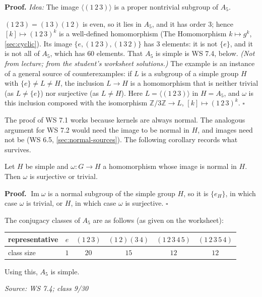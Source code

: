 \documentclass[11pt]{report}
\renewenvironment{proof}[1][Proof]{\noindent\textbf{#1.} }{\hfill$\square$\par\vspace{5pt}}
\newcommand{\srcline}[1]{\par\hfill{\footnotesize\textit{Source: #1}}}
\begin{document}
\begin{proof}
\textit{Idea:} The image $\langle (1\,2\,3) \rangle$ is a proper nontrivial subgroup of $A_5$.\par
$(1\,2\,3) = (1\,3)(1\,2)$ is even, so it lies in $A_5$, and it has order $3$; hence $[k] \mapsto (1\,2\,3)^k$ is a well-defined homomorphism (The Homomorphism $k \mapsto g^k$, \ref{sec:cyclic}). Its image $\{e, (1\,2\,3), (1\,3\,2)\}$ has $3$ elements: it is not $\{e\}$, and it is not all of $A_5$, which has $60$ elements. That $A_5$ is simple is WS 7.4, below. \textit{(Not from lecture; from the student's worksheet solutions.)} The example is an instance of a general source of counterexamples: if $L$ is a subgroup of a simple group $H$ with $\{e\} \neq L \neq H$, the inclusion $L \to H$ is a homomorphism that is neither trivial (as $L \neq \{e\}$) nor surjective (as $L \neq H$). Here $L = \langle (1\,2\,3) \rangle$ in $H = A_5$, and $\omega$ is this inclusion composed with the isomorphism $\mathbb{Z}/3\mathbb{Z} \to L$, $[k] \mapsto (1\,2\,3)^k$.
\end{proof}

\begin{rembox}\label{rem:why-7-1-does-not-dualize}
The proof of WS 7.1 works because kernels are always normal. The analogous argument for WS 7.2 would need the image to be normal in $H$, and images need not be (WS 6.5, \ref{sec:normal-sources}). The following corollary records what survives.
\end{rembox}

\begin{corbox}\label{cor:normal-image-simple-group}
Let $H$ be simple and $\omega: G \to H$ a homomorphism whose image is normal in $H$. Then $\omega$ is surjective or trivial.
\end{corbox}

\begin{proof}
$\operatorname{Im}\omega$ is a normal subgroup of the simple group $H$, so it is $\{e_H\}$, in which case $\omega$ is trivial, or $H$, in which case $\omega$ is surjective.
\end{proof}

\begin{propbox}[{$A_5$ Is Simple}]\label{prop:a5-simple}
The conjugacy classes of $A_5$ are as follows (as given on the worksheet):
\begin{center}
\begin{tabular}{l|ccccc}
representative & $e$ & $(1\,2\,3)$ & $(1\,2)(3\,4)$ & $(1\,2\,3\,4\,5)$ & $(1\,2\,3\,5\,4)$ \\ \hline
class size & $1$ & $20$ & $15$ & $12$ & $12$
\end{tabular}
\end{center}
Using this, $A_5$ is simple.
\srcline{WS 7.4; class 9/30}
\end{propbox}
\end{document}
